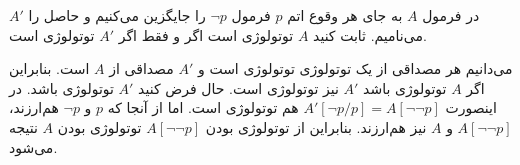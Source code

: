 در فرمول $A$ به جای هر وقوع اتم $p$ فرمول $\neg p$ را جایگزین می‌کنیم و حاصل را $A'$ می‌نامیم. ثابت کنید $A$ توتولوژی است اگر و فقط اگر $A'$ توتولوژی است.
\begin{ans}
  می‌دانیم هر مصداقی از یک توتولوژی توتولوژی است و $A'$ مصداقی از $A$ است. بنابراین اگر $A$ توتولوژی باشد $A'$ نیز توتولوژی است. حال فرض کنید $A'$ توتولوژی باشد. در اینصورت $A'[\neg p/p]=A[\neg\neg p]$ هم توتولوژی است. اما از آنجا که $p$ و $\neg p$ هم‌ارزند، $A[\neg\neg p]$ و $A$ نیز هم‌ارزند. بنابراین از توتولوژی بودن $A[\neg\neg p]$ توتولوژی بودن $A$ نتیجه می‌شود.
\end{ans}